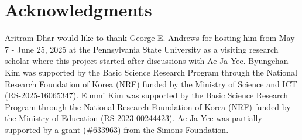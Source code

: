 \documentclass[11pt,reqno]{amsart}
\theoremstyle{remark}
\numberwithin{equation}{section}
\begin{document}
 

\section*{Acknowledgments}

Aritram Dhar would like to thank George E. Andrews for hosting him from May 7 - June 25, 2025 at the Pennsylvania State University as a visiting research scholar where this project started after discussions with Ae Ja Yee. Byungchan Kim was supported by the Basic Science Research Program through the National Research Foundation of Korea (NRF) funded by the Ministry of Science and ICT (RS-2025-16065347).
Eunmi Kim was supported by the Basic Science Research Program through the National Research Foundation of Korea (NRF) funded by the Ministry of Education (RS-2023-00244423). 
Ae Ja Yee was partially supported by a grant ($\#$633963) from the Simons Foundation.


 
\end{document}
